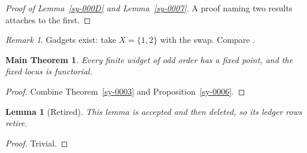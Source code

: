 \documentclass{amsart}
\theoremstyle{plain}
\newtheorem{lemma}[theorem]{Lemma}
\newtheorem*{mainthm}{Main Theorem}
\theoremstyle{definition}
\theoremstyle{remark}
\newtheorem{remark}[theorem]{Remark}
\begin{document}

\begin{proof}[Proof of Lemma~\ref{sy-000D} and Lemma~\ref{sy-0007}]
A proof naming two results attaches to the first.
\end{proof}

\begin{remark}\label{sy-000A}
Gadgets exist: take $X = \{1,2\}$ with the swap. Compare \cite[Theorem 2.1]{Kre99}.
\end{remark}


\begin{mainthm}\label{sy-000B}
Every finite widget of odd order has a fixed point, and the fixed locus is functorial.
\end{mainthm}
\begin{proof}
Combine Theorem~\ref{sy-0003} and Proposition~\ref{sy-0006}.
\end{proof}


\begin{lemma}[Retired]\label{sy-000F}
This lemma is accepted and then deleted, so its ledger rows retire.
\end{lemma}
\begin{proof}
Trivial.
\end{proof}



\end{document}
